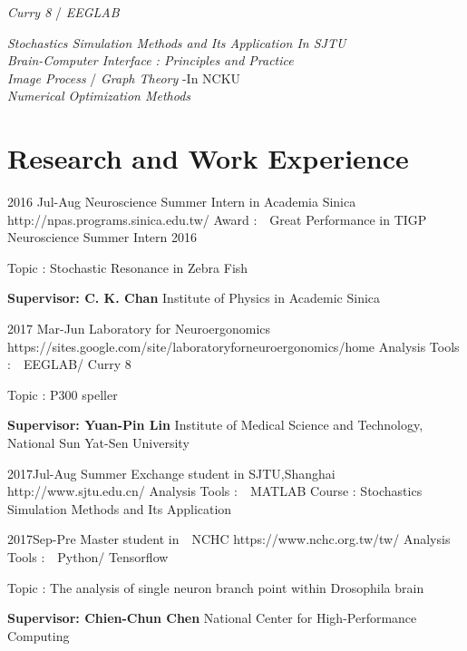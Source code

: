 \documentclass[10pt]{article} %
\begin{document}
{
\textit{Curry 8} /
\textit{EEGLAB}\\
}


{
\textit{Stochastics Simulation Methods and Its Application In SJTU } \\
\textit{Brain-Computer Interface : Principles and Practice}\\
\textit{Image Process } /  
\textit{Graph Theory} -In NCKU\\
\textit{Numerical Optimization Methods } 
}


\section{Research and Work Experience}

\job
{2016 }{Jul-Aug}
{Neuroscience Summer Intern in Academia Sinica }
{http://npas.programs.sinica.edu.tw/}
{Award :　Great Performance in TIGP Neuroscience Summer Intern 2016}
{Topic : Stochastic Resonance in Zebra Fish\\
\rule{0mm}{5mm}\textbf{Supervisor: C. K. Chan} Institute of Physics in Academic Sinica}
\job
{2017 }{Mar-Jun}
{Laboratory for Neuroergonomics}
{https://sites.google.com/site/laboratoryforneuroergonomics/home}
{Analysis Tools :　EEGLAB/ Curry 8}
{Topic : P300 speller\\
\rule{0mm}{5mm}\textbf{Supervisor: Yuan-Pin Lin } Institute of Medical Science and Technology, National Sun Yat-Sen University}
\job
{2017}{Jul-Aug}
{Summer Exchange student in SJTU,Shanghai }
{http://www.sjtu.edu.cn/}
{Analysis Tools :　MATLAB}
{Course : Stochastics Simulation Methods and Its Application }

\job
{2017}{Sep-Pre}
{Master student in　NCHC  }
{https://www.nchc.org.tw/tw/}
{Analysis Tools :　Python/ Tensorflow}
{Topic : The analysis of single neuron branch point within Drosophila brain\\
\rule{0mm}{5mm}\textbf{Supervisor: Chien-Chun Chen } National Center for High-Performance Computing }
\end{document}
